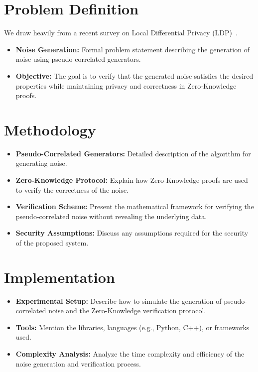 \documentclass[11pt]{article}
\begin{document}
\section{Problem Definition}
We draw heavily from a recent survey on Local Differential Privacy (LDP)~\cite{yang2023local}.
\begin{itemize}
    \item \textbf{Noise Generation:} Formal problem statement describing the generation of noise using pseudo-correlated generators.
    \item \textbf{Objective:} The goal is to verify that the generated noise satisfies the desired properties while maintaining privacy and correctness in Zero-Knowledge proofs.
\end{itemize}

\section{Methodology}
\begin{itemize}
    \item \textbf{Pseudo-Correlated Generators:} Detailed description of the algorithm for generating noise.
    \item \textbf{Zero-Knowledge Protocol:} Explain how Zero-Knowledge proofs are used to verify the correctness of the noise.
    \item \textbf{Verification Scheme:} Present the mathematical framework for verifying the pseudo-correlated noise without revealing the underlying data.
    \item \textbf{Security Assumptions:} Discuss any assumptions required for the security of the proposed system.
\end{itemize}

\section{Implementation}
\begin{itemize}
    \item \textbf{Experimental Setup:} Describe how to simulate the generation of pseudo-correlated noise and the Zero-Knowledge verification protocol.
    \item \textbf{Tools:} Mention the libraries, languages (e.g., Python, C++), or frameworks used.
    \item \textbf{Complexity Analysis:} Analyze the time complexity and efficiency of the noise generation and verification process.
\end{itemize}
\end{document}
